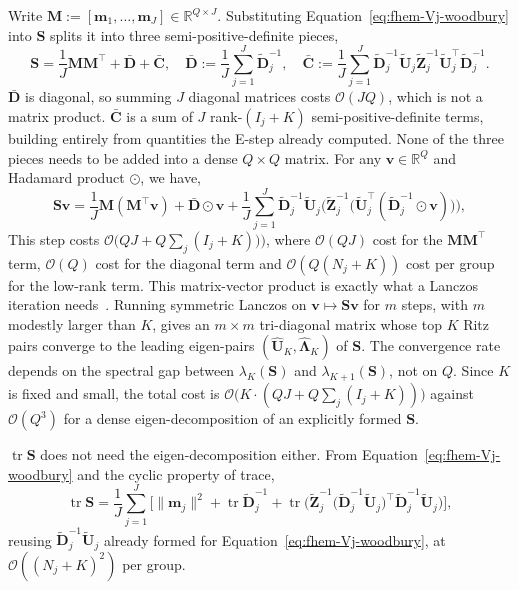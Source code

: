 Write $\mathbf M:=[\mathbf m_1,\dots,\mathbf m_J]\in\mathbb R^{Q\times J}$. Substituting
Equation~\eqref{eq:fhem-Vj-woodbury} into $\mathbf S$ splits it into three semi-positive-definite pieces,
\begin{equation}
    \mathbf S=\frac1J\mathbf M\mathbf M^\top+\bar{\mathbf D}+\bar{\mathbf C},
    \quad
    \bar{\mathbf D}:=\frac1J\sum_{j=1}^J\tilde{\mathbf D}_j^{-1},
    \quad
    \bar{\mathbf C}:=\frac1J\sum_{j=1}^J\tilde{\mathbf D}_j^{-1}\tilde{\mathbf U}_j\tilde{\mathbf Z}_j^{-1}
    \tilde{\mathbf U}_j^\top\tilde{\mathbf D}_j^{-1}.
    \label{eq:S-operator}
\end{equation}
$\bar{\mathbf D}$ is diagonal, so summing $J$ diagonal matrices costs $\mathcal O(JQ)$, which is not a matrix product. $\bar{\mathbf C}$ is a sum of $J$ rank-$(I_j+K)$ semi-positive-definite terms, building entirely from quantities the E-step already computed. None of the three pieces needs to be added into a dense $Q\times Q$ matrix. For any $\mathbf v\in\mathbb R^Q$ and Hadamard product $\odot$, we have,
\begin{equation}
    \mathbf S\mathbf v=\frac1J\mathbf M(\mathbf M^\top\mathbf v)+\bar{\mathbf D}\odot\mathbf v +\frac1J\sum_{j=1}^J\tilde{\mathbf D}_j^{-1}\tilde{\mathbf U}_j\Big(\tilde{\mathbf Z}_j^{-1}
    \big(\tilde{\mathbf U}_j^\top(\tilde{\mathbf D}_j^{-1}\odot\mathbf v)\big)\Big),
    \label{eq:Sv-matvec}
\end{equation}
This step costs $\mathcal O\big(QJ+Q\sum_j(I_j+K))\big)$, where $\mathcal O(QJ)$ cost for the $\mathbf M\mathbf M^\top$ term,
$\mathcal O(Q)$ cost for the diagonal term and $\mathcal O(Q(N_j+K))$ cost per group for the low-rank term. This matrix-vector product is exactly what a Lanczos iteration needs~\citep{Musco2015}. Running symmetric Lanczos on $\mathbf v\mapsto\mathbf S\mathbf v$ for $m$ steps, with $m$ modestly larger than $K$, gives an $m\times m$
tri-diagonal matrix whose top $K$ Ritz pairs converge to the leading eigen-pairs $(\hat{\mathbf U}_K,\hat{\bm\Lambda}_K)$
of $\mathbf S$. The convergence rate depends on the spectral gap between $\lambda_K(\mathbf S)$ and
$\lambda_{K+1}(\mathbf S)$, not on $Q$. Since $K$ is fixed and small, the total cost is
$\mathcal O\big(K\cdot (QJ+Q\sum_j(I_j+K))\big)$ against $\mathcal O(Q^3)$ for a dense eigen-decomposition of an
explicitly formed $\mathbf S$.

$\operatorname{tr}\mathbf S$ does not need the eigen-decomposition either. From Equation~\eqref{eq:fhem-Vj-woodbury} and the cyclic property of trace,
\begin{equation}
    \operatorname{tr}\mathbf S=\frac1J\sum_{j=1}^J\Big[\|\mathbf m_j\|^2+\operatorname{tr}\tilde{\mathbf D}_j^{-1}
    +\operatorname{tr}\Big(\tilde{\mathbf Z}_j^{-1}\big(\tilde{\mathbf D}_j^{-1}\tilde{\mathbf U}_j\big)^\top
    \tilde{\mathbf D}_j^{-1}\tilde{\mathbf U}_j\Big)\Big],
    \label{eq:trS-woodbury}
\end{equation}
reusing $\tilde{\mathbf D}_j^{-1}\tilde{\mathbf U}_j$ already formed for Equation~\eqref{eq:fhem-Vj-woodbury}, at
$\mathcal O((N_j+K)^2)$ per group.

